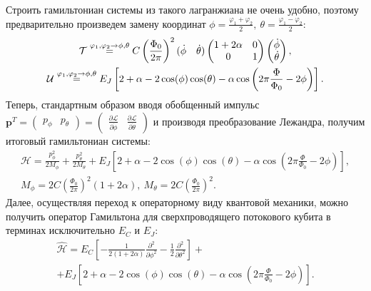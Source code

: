 \documentclass[12pt, twoside]{report}
\numberwithin{equation}{section}
\numberwithin{figure}{section}
\begin{document}
Строить гамильтониан системы из такого лагранжиана не очень удобно, поэтому предварительно произведем замену координат $\displaystyle \phi = \frac{\varphi_1 + \varphi_2}{2},\ \theta = \frac{\varphi_1 - \varphi_2}{2}$:
\begin{gather}
\mathcal{T}  \overset {\varphi_1, \varphi_2 \rightarrow \phi, \theta}{=}
C\left(\frac{\Phi_0}{2\pi}\right)^2 (\begin{matrix}
\dot \phi & \dot \theta
\end{matrix})
\left(\begin{matrix}
1+2\alpha & 0\\
0 & 1
\end{matrix}
\right)
\left(\begin{matrix}
\dot \phi \\ \dot \theta
\end{matrix}\right), \notag
\\
\mathcal{U} \overset {\varphi_1, \varphi_2 \rightarrow \phi, \theta}{=} E_J\left[2+\alpha - 2\cos(\phi)\cos(\theta) - \alpha\cos\left(2\pi\frac{\Phi}{\Phi_0} -2\phi\right)\right].
\label{eq:U_qb}
\end{gather}
Теперь, стандартным образом вводя обобщенный импульс 
$\displaystyle \mathbf{p}^T = \left(\begin{matrix}p_\phi & p_\theta\end{matrix}\right) = \left(\begin{matrix}\frac{\partial\mathcal{L}}{\partial\dot\phi} & \frac{\partial\mathcal{L}}{\partial\dot\theta}\end{matrix}\right)$ и производя преобразование Лежандра, получим итоговый гамильтониан системы:
\begin{gather*}
\mathcal{H} = \frac{p_\phi^2}{2M_\phi} + \frac{p_\theta^2}{2M_\theta}+ E_J\left[2+\alpha - 2\cos(\phi)\cos(\theta) - \alpha\cos\left(2\pi\frac{\Phi}{\Phi_0} -2\phi\right)\right], \\
M_\phi = 2C\left(\frac{\Phi_0}{2\pi}\right)^2(1+2\alpha),\ M_\theta = 2C\left(\frac{\Phi_0}{2\pi}\right)^2.
\end{gather*}
Далее, осуществляя переход к операторному виду квантовой механики, можно получить оператор Гамильтона для сверхпроводящего потокового кубита в терминах исключительно $E_C$ и $E_J$:
\begin{equation}
\begin{gathered}
\hat{\mathcal{H}} = E_C\left[-\frac{1}{2(1 + 2\alpha)}\frac{\partial^2}{\partial\phi^2} 
- \frac{1}{2}\frac{\partial^2}{\partial\theta^2}\right] + \\ + E_J\left[2+\alpha - 2\cos(\phi)\cos(\theta) - \alpha\cos\left(2\pi\frac{\Phi}{\Phi_0} -2\phi \right)\right].
\end{gathered}
\label{eq:hamiltonian}
\end{equation}
\end{document}
